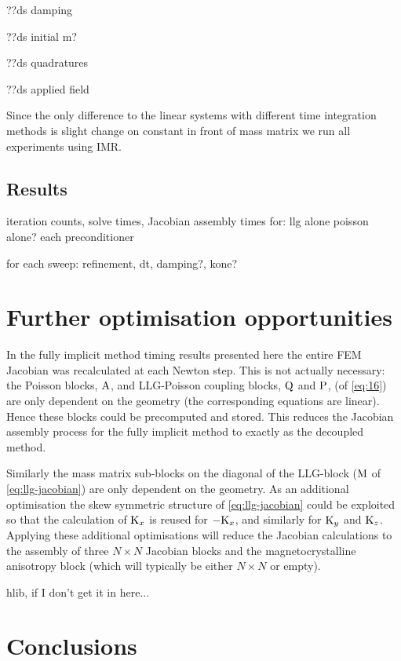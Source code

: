 ??ds damping

??ds initial m?

??ds quadratures

??ds applied field

Since the only difference to the linear systems with different time integration methods is slight change on constant in front of mass matrix we run all experiments using IMR.


\subsection{Results}


iteration counts, solve times, Jacobian assembly times for:
llg alone
poisson alone?
each preconditioner

for each sweep: refinement, dt, damping?, kone?


\section{Further optimisation opportunities}

In the fully implicit method timing results presented here the entire FEM Jacobian was recalculated at each Newton step.
This is not actually necessary: the Poisson blocks, $\mathrm{A}$, and LLG-Poisson coupling blocks, $\mathrm{Q}$ and $\mathrm{P}$, (of \cref{eq:16}) are only dependent on the geometry (\ie the corresponding equations are linear).
Hence these blocks could be precomputed and stored.
This reduces the Jacobian assembly process for the fully implicit method to exactly as the decoupled method.

Similarly the mass matrix sub-blocks on the diagonal of the LLG-block ($\mathrm{M}$ of \cref{eq:llg-jacobian}) are only dependent on the geometry.
As an additional optimisation the skew symmetric structure of \cref{eq:llg-jacobian} could be exploited so that the calculation of $\mathrm{K}_x$ is reused for $-\mathrm{K}_x$, and similarly for $\mathrm{K}_y$ and $\mathrm{K}_z$.
Applying these additional optimisations will reduce the Jacobian calculations to the assembly of three $N \times N$ Jacobian blocks and the magnetocrystalline anisotropy block (which will typically be either $N \times N$ or empty).


hlib, if I don't get it in here...



\section{Conclusions}

